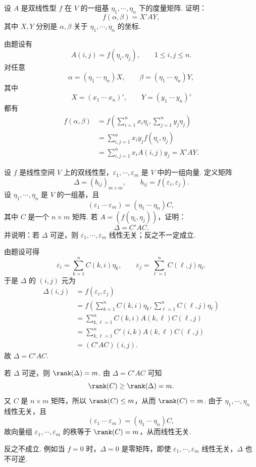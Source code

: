 \begin{problem}

	设 $A$ 是双线性型 $f$ 在 $V$ 的一组基 $\eta_1,\cdots,\eta_n$ 下的度量矩阵. 证明：
	\[
	f(\alpha,\beta)=X'AY,
	\]
	其中 $X,Y$ 分别是 $\alpha,\beta$ 关于 $\eta_1,\cdots,\eta_n$ 的坐标.
\end{problem}

\begin{solution}
	由题设有
	\[
	A(i,j)=f(\eta_i,\eta_j),
	\qquad 1\le i,j\le n.
	\]
	对任意
	\[
	\alpha=(\eta_1\ \cdots\ \eta_n)X,
	\qquad
	\beta=(\eta_1\ \cdots\ \eta_n)Y,
	\]
	其中
	\[
	X=(x_1\ \cdots\ x_n)',
	\qquad
	Y=(y_1\ \cdots\ y_n)'
	\]
	都有
	\[
	\begin{aligned}
		f(\alpha,\beta)
		&=f\left(\sum_{i=1}^n x_i\eta_i,\sum_{j=1}^n y_j\eta_j\right) \\
		&=\sum_{i,j=1}^n x_iy_jf(\eta_i,\eta_j) \\
		&=\sum_{i,j=1}^n x_iA(i,j)y_j
		=X'AY.
	\end{aligned}
	\]
\end{solution}

\begin{problem}
	设 $f$ 是线性空间 $V$ 上的双线性型，$\varepsilon_1,\cdots,\varepsilon_m$ 是 $V$ 中的一组向量. 定义矩阵
	\[
	\Delta=(b_{ij})_{m\times m},
	\qquad b_{ij}=f(\varepsilon_i,\varepsilon_j).
	\]
	设 $\eta_1,\cdots,\eta_n$ 是 $V$ 的一组基，且
	\[
	(\varepsilon_1\ \cdots\ \varepsilon_m)=(\eta_1\ \cdots\ \eta_n)C,
	\]
	其中 $C$ 是一个 $n\times m$ 矩阵. 若 $A=(f(\eta_i,\eta_j))$，证明：
	\[
	\Delta=C'AC.
	\]
	并说明：若 $\Delta$ 可逆，则 $\varepsilon_1,\cdots,\varepsilon_m$ 线性无关；反之不一定成立.
\end{problem}

\begin{solution}
	由题设可得
	\[
	\varepsilon_i=\sum_{k=1}^n C(k,i)\eta_k,
	\qquad
	\varepsilon_j=\sum_{\ell=1}^n C(\ell,j)\eta_\ell.
	\]
	于是 $\Delta$ 的 $(i,j)$ 元为
	\[
	\begin{aligned}
		\Delta(i,j)
		&=f(\varepsilon_i,\varepsilon_j) \\
		&=f\left(\sum_{k=1}^n C(k,i)\eta_k,
		\sum_{\ell=1}^n C(\ell,j)\eta_\ell\right) \\
		&=\sum_{k,\ell=1}^n C(k,i)A(k,\ell)C(\ell,j) \\
		&=\sum_{k,\ell=1}^n C'(i,k)A(k,\ell)C(\ell,j) \\
		&=(C'AC)(i,j).
	\end{aligned}
	\]
	故 $\Delta=C'AC$.
	
	若 $\Delta$ 可逆，则 $\rank(\Delta)=m$. 由 $\Delta=C'AC$ 可知
	\[
	\rank(C)\ge \rank(\Delta)=m.
	\]
	又 $C$ 是 $n\times m$ 矩阵，所以 $\rank(C)\le m$，从而 $\rank(C)=m$.
	由于 $\eta_1,\cdots,\eta_n$ 线性无关，且
	\[
	(\varepsilon_1\ \cdots\ \varepsilon_m)=(\eta_1\ \cdots\ \eta_n)C,
	\]
	故向量组 $\varepsilon_1,\cdots,\varepsilon_m$ 的秩等于 $\rank(C)=m$，从而线性无关.
	
	反之不成立. 例如当 $f=0$ 时，$\Delta=0$ 是零矩阵，即使 $\varepsilon_1,\cdots,\varepsilon_m$ 线性无关，$\Delta$ 也不可逆.
\end{solution}

